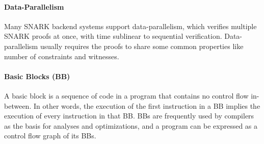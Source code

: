 \paragraph{Data-Parallelism} Many SNARK backend systems support data-parallelism, which verifies multiple SNARK proofs at once, with time sublinear to sequential verification. Data-parallelism usually requires the proofs to share some common properties like number of constraints and witnesses.

\paragraph{Basic Blocks (BB)} A basic block is a sequence of code in a program that contains no control flow in-between. In other words, the execution of the first instruction in a BB implies the execution of every instruction in that BB. BBs are frequently used by compilers as the basis for analyses and optimizations, and a program can be expressed as a control flow graph of its BBs.